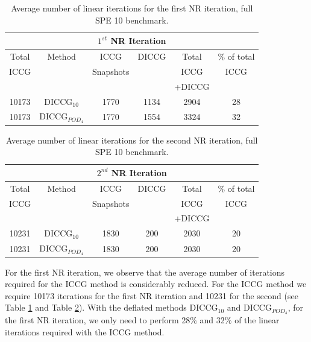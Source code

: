 \documentclass[review]{elsarticle}
\begin{document}
\begin{table}[!ht]\centering
\begin{minipage}{1\textwidth}
\vspace{-10pt}
\centering
\begin{tabular}{ ||c||c|c|c|c|c||} 
  \hline
   \multicolumn{6}{|c|}{$1^{st}$ NR Iteration}  \\
\hline
Total& Method &ICCG &DICCG &Total&\% of total\\
ICCG   &  & Snapshots& &ICCG& ICCG\\
       &  &          & & +DICCG& \\
\hline

10173&DICCG$_{10}$&1770&1134&2904&28 \\
10173 &DICCG$_{POD_4}$&1770&1554&3324&32  \\
\hline
 \end{tabular}
\caption{Average number of linear iterations for the first NR iteration, full SPE 10 benchmark.}\label{table:literspe1}
\end{minipage}
\end{table}
\begin{table}[!ht]\centering
\begin{minipage}{1\textwidth}
\vspace{-10pt}
\centering
\begin{tabular}{ ||c||c|c|c|c|c||} 
  \hline
   \multicolumn{6}{|c|}{$2^{nd}$ NR Iteration}  \\
\hline
Total& Method & ICCG&DICCG &Total&\% of total\\
ICCG   &  & Snapshots& &ICCG& ICCG\\
&  &          & & +DICCG& \\
\hline
10231&DICCG$_{10}$&1830&200&2030&20 \\
10231 &DICCG$_{POD_4}$&1830&200&2030&20 \\

\hline
 \end{tabular}
\caption{Average number of linear iterations for the second NR iteration, full SPE 10 benchmark.}\label{table:literspe2}
\end{minipage}
\end{table}
For the first NR iteration, we observe that the average number of iterations required for the ICCG method  is considerably reduced. For the ICCG method we require 10173 iterations for the first NR iteration and 10231 for the second (see Table \ref{table:literspe1} and Table \ref{table:literspe2}). With the deflated methods DICCG$_{10}$ and DICCG$_{POD_4}$, for the first NR iteration, we only need to perform 28\% and 32\% of the linear iterations required with the ICCG method.\\
\end{document}
